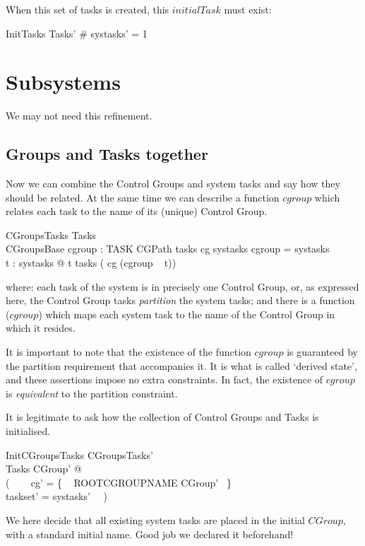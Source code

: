 \documentclass[a4paper,twoside,12pt]{article}
\begin{document}
When this set of tasks is created, this $initialTask$ must exist:

\begin{schema}{InitTasks}
Tasks'
\where
\# systasks' = 1
\end{schema}
\section{Subsystems}
We may not need this refinement.

\subsection{Groups and Tasks together}
Now we can combine the Control Groups and system tasks and say how they should be related. At the same time we can describe a function $cgroup$ which relates each task to the name of its (unique) Control Group.

\begin{schema}{CGroupsTasks}
Tasks \\
CGroupsBase
\also
cgroup : TASK \ffun CGPath
\where
tasks \circ cg \partition systasks
\also
\dom cgroup = systasks \\
\forall t : systasks @ t \in tasks ( cg (cgroup ~ t))
\end{schema}
where: each task of the system is in precisely one Control Group, or, as expressed here, the Control Group tasks \emph{partition} the system tasks; and there is a function ($cgroup$) which maps each system task to the name of the Control Group in which it resides.

It is important to note that the existence of the function $cgroup$ is guaranteed by the partition requirement that accompanies it. It is what is called `derived state', and these assertions impose no extra constraints. In fact, the existence of $cgroup$ is \emph{equivalent} to the partition constraint.

It is legitimate to ask how the collection of Control Groups and Tasks is initialised.

\begin{schema}{InitCGroupsTasks}
CGroupsTasks' \\
\Xi Tasks
\where
\exists CGroup' @ \\
( ~~~ cg' = \{ ~ ROOTCGROUPNAME \mapsto \theta CGroup' ~\} \\
\land taskset' = systasks' ~~)
\end{schema}
We here decide that all existing system tasks are placed in the initial $CGroup$, with a standard initial name. Good job we declared it beforehand!
\end{document}
